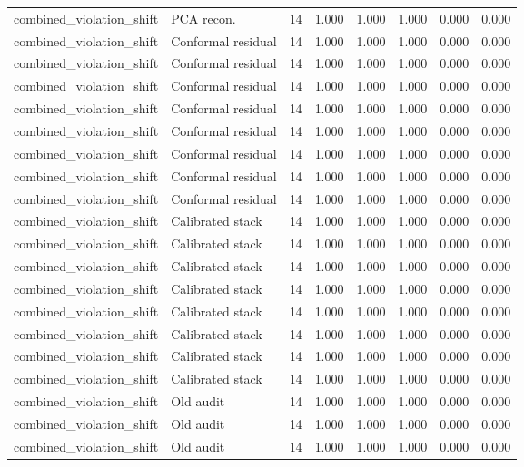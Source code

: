 {\begin{longtable}{llrrrrrr}
combined\_violation\_shift & PCA recon. & 14 & 1.000 & 1.000 & 1.000 & 0.000 & 0.000 \\
combined\_violation\_shift & Conformal residual & 14 & 1.000 & 1.000 & 1.000 & 0.000 & 0.000 \\
combined\_violation\_shift & Conformal residual & 14 & 1.000 & 1.000 & 1.000 & 0.000 & 0.000 \\
combined\_violation\_shift & Conformal residual & 14 & 1.000 & 1.000 & 1.000 & 0.000 & 0.000 \\
combined\_violation\_shift & Conformal residual & 14 & 1.000 & 1.000 & 1.000 & 0.000 & 0.000 \\
combined\_violation\_shift & Conformal residual & 14 & 1.000 & 1.000 & 1.000 & 0.000 & 0.000 \\
combined\_violation\_shift & Conformal residual & 14 & 1.000 & 1.000 & 1.000 & 0.000 & 0.000 \\
combined\_violation\_shift & Conformal residual & 14 & 1.000 & 1.000 & 1.000 & 0.000 & 0.000 \\
combined\_violation\_shift & Conformal residual & 14 & 1.000 & 1.000 & 1.000 & 0.000 & 0.000 \\
combined\_violation\_shift & Calibrated stack & 14 & 1.000 & 1.000 & 1.000 & 0.000 & 0.000 \\
combined\_violation\_shift & Calibrated stack & 14 & 1.000 & 1.000 & 1.000 & 0.000 & 0.000 \\
combined\_violation\_shift & Calibrated stack & 14 & 1.000 & 1.000 & 1.000 & 0.000 & 0.000 \\
combined\_violation\_shift & Calibrated stack & 14 & 1.000 & 1.000 & 1.000 & 0.000 & 0.000 \\
combined\_violation\_shift & Calibrated stack & 14 & 1.000 & 1.000 & 1.000 & 0.000 & 0.000 \\
combined\_violation\_shift & Calibrated stack & 14 & 1.000 & 1.000 & 1.000 & 0.000 & 0.000 \\
combined\_violation\_shift & Calibrated stack & 14 & 1.000 & 1.000 & 1.000 & 0.000 & 0.000 \\
combined\_violation\_shift & Calibrated stack & 14 & 1.000 & 1.000 & 1.000 & 0.000 & 0.000 \\
combined\_violation\_shift & Old audit & 14 & 1.000 & 1.000 & 1.000 & 0.000 & 0.000 \\
combined\_violation\_shift & Old audit & 14 & 1.000 & 1.000 & 1.000 & 0.000 & 0.000 \\
combined\_violation\_shift & Old audit & 14 & 1.000 & 1.000 & 1.000 & 0.000 & 0.000 \\

\end{longtable}}
